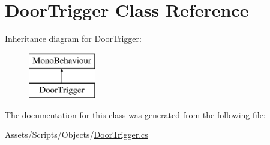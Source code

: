 \hypertarget{class_door_trigger}{}\section{Door\+Trigger Class Reference}
\label{class_door_trigger}
Inheritance diagram for Door\+Trigger\+:\begin{figure}[H]
\begin{center}
\leavevmode
\includegraphics[height=2.000000cm]{class_door_trigger}
\end{center}
\end{figure}


The documentation for this class was generated from the following file\+:\begin{DoxyCompactItemize}
\item 
Assets/\+Scripts/\+Objects/\mbox{\hyperlink{_door_trigger_8cs}{Door\+Trigger.\+cs}}\end{DoxyCompactItemize}
